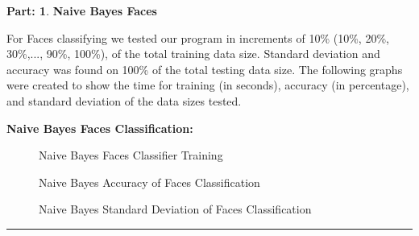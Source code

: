 \documentclass{article}
\theoremstyle{definition}
\def\fline{\rule{0.75\linewidth}{0.5pt}}
\newcommand{\finishline}{\begin{center}\fline\end{center}}
\newtheorem*{solution*}{Part: }
\newenvironment{solution}{\begin{solution*}}{{\finishline} \end{solution*}}
\begin{document}
\begin{solution}
\item \textbf{Naive Bayes Faces}
\item For Faces classifying we tested our program in increments of 10\% (10\%, 20\%, 30\%,..., 90\%, 100\%), of the total training data size. Standard deviation and accuracy was found on 100\% of the total testing data size. The following graphs were created to show the time for training (in seconds), accuracy (in percentage), and standard deviation of the data sizes tested. 

\item \textbf{Naive Bayes Faces Classification:}

\begin{figure}[h!]
            \centering
            \item 
            \caption{Naive Bayes Faces Classifier Training}
        \end{figure}

\item
\begin{figure}[h!]
            \centering
            \item 
            \caption{Naive Bayes Accuracy of Faces Classification}
        \end{figure}
        
\item
\begin{figure}[h!]
            \centering
            \item 
            \caption{Naive Bayes Standard Deviation of Faces Classification}
        \end{figure}

\begin{newpage}
\end{newpage}


\end{solution}
\end{document}
